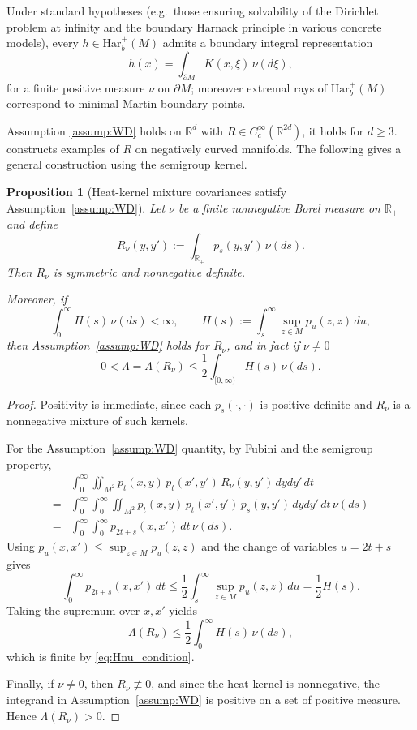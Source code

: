 \documentclass{article}
\newtheorem{proposition}[theorem]{Proposition}
\numberwithin{theorem}{section}
\def\RR{\mathbb{R}} %
\begin{document}
Under standard hypotheses (e.g.\ those ensuring solvability of the Dirichlet problem at infinity and the boundary Harnack principle in various concrete models), every $h\in \mathrm{Har}_b^+(M)$ admits a boundary integral representation
\begin{equation}\label{eq:martin-rep}
h(x)=\int_{\partial M} K(x,\xi)\,\nu(d\xi),
\end{equation}
for a finite positive measure $\nu$ on $\partial M$; moreover extremal rays of $\mathrm{Har}_b^+(M)$ correspond to minimal Martin boundary points.

Assumption \eqref{assump:WD} holds on $\RR^d$ with $R\in C_c^\infty(\RR^{2d})$, it holds for $d\ge3$. \cite{BCO24,geng-ouyang} constructs examples of $R$ on negatively curved manifolds. The following gives a general construction using the semigroup kernel.

\begin{proposition}[Heat-kernel mixture covariances satisfy Assumption~\ref{assump:WD}]\label{prop:Lambda_heat_kernel_mixture}
Let $\nu$ be a finite nonnegative Borel measure on $\RR_+$ and define
\[
R_\nu(y,y') := \int_{\RR_+} p_s(y,y')\,\nu(ds).
\]
Then $R_\nu$ is symmetric and nonnegative definite.

Moreover, if
\begin{equation}\label{eq:Hnu_condition}
\int_0^\infty H(s)\,\nu(ds) < \infty,
\qquad
H(s):=\int_s^\infty \sup_{z\in M} p_u(z,z)\,du,
\end{equation}
then Assumption~\ref{assump:WD} holds for $R_\nu$, and in fact if $\nu\neq 0$
\[
0<\Lambda=\Lambda(R_\nu)\le \frac12 \int_{[0,\infty)} H(s)\,\nu(ds).
\]
\end{proposition}
\begin{proof}
Positivity is immediate, since each $p_s(\cdot,\cdot)$ is positive definite and $R_\nu$ is a nonnegative mixture of such kernels.

For the Assumption~\ref{assump:WD} quantity, by Fubini and the semigroup property,
\begin{align*}
&\int_0^\infty \iint_{M^2} p_t(x,y)\,p_t(x',y')\,R_\nu(y,y')\,dydy'\,dt \\
=&
\int_0^\infty \int_0^\infty \iint_{M^2} p_t(x,y)\,p_t(x',y')\,p_s(y,y')\,dydy'\,dt\,\nu(ds) \\
=&
\int_0^\infty \int_0^\infty p_{2t+s}(x,x')\,dt\,\nu(ds).
\end{align*}
Using $p_u(x,x')\le \sup_{z\in M}p_u(z,z)$ and the change of variables $u=2t+s$ gives
\[
\int_0^\infty p_{2t+s}(x,x')\,dt
\le
\frac12\int_s^\infty \sup_{z\in M} p_u(z,z)\,du
=
\frac12 H(s).
\]
Taking the supremum over $x,x'$ yields
\[
\Lambda(R_\nu)\le \frac12\int_0^\infty H(s)\,\nu(ds),
\]
which is finite by \eqref{eq:Hnu_condition}.

Finally, if $\nu\neq 0$, then $R_\nu\not\equiv 0$, and since the heat kernel is nonnegative, the integrand in Assumption~\ref{assump:WD} is positive on a set of positive measure. Hence $\Lambda(R_\nu)>0$.
\end{proof}
\end{document}
